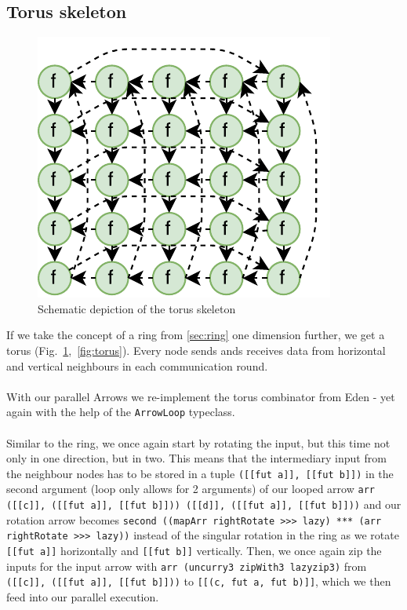 \documentclass{jfp1}
\newcommand{\inlinecode}[1]{\texttt{#1}}
\begin{document}
\subsection{Torus skeleton}
\begin{figure}
	\includegraphics[scale=0.75]{images/torus}
	\caption{Schematic depiction of the torus skeleton}
	\label{fig:ringTorusImg}
\end{figure}
If we take the concept of a ring from \ref{sec:ring} one dimension further, we get a torus (Fig.~\ref{fig:ringTorusImg},~\ref{fig:torus}). Every node sends ands receives data from horizontal and vertical neighbours in each communication round.
\\\\
With our parallel Arrows we re-implement the torus combinator from Eden \citep{eden_skel_topology} - yet again with the help of the \inlinecode{ArrowLoop} typeclass.
\\\\
Similar to the ring, we once again start by rotating the input, but this time not only in one direction, but in two. This means that the intermediary input from the neighbour nodes has to be stored in a tuple \inlinecode{([[fut a]], [[fut b]])} in the second argument (loop only allows for 2 arguments) of our looped arrow \inlinecode{arr ([[c]], ([[fut a]], [[fut b]])) ([[d]], ([[fut a]], [[fut b]]))} and our rotation arrow becomes \inlinecode{second ((mapArr rightRotate >>> lazy) *** (arr rightRotate >>> lazy))} instead of the singular rotation in the ring as we rotate \inlinecode{[[fut a]]} horizontally and \inlinecode{[[fut b]]} vertically. Then, we once again zip the inputs for the input arrow with \inlinecode{arr (uncurry3 zipWith3 lazyzip3)} from \inlinecode{([[c]], ([[fut a]], [[fut b]]))} to \inlinecode{[[(c, fut a, fut b)]]}, which we then feed into our parallel execution.
\end{document}
